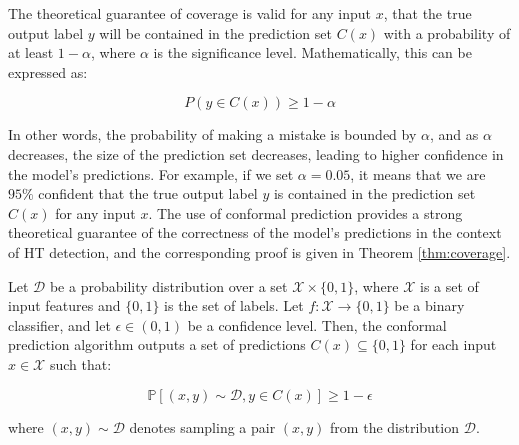 The theoretical guarantee of coverage is valid for any input $x$, that the true output label $y$ will be contained in the prediction set $C(x)$ with a probability of at least $1 - \alpha$, where $\alpha$ is the significance level. Mathematically, this can be expressed as:

$$
P(y \in C(x)) \geq 1 - \alpha
$$

In other words, the probability of making a mistake is bounded by $\alpha$, and as $\alpha$ decreases, the size of the prediction set decreases, leading to higher confidence in the model's predictions. For example, if we set $\alpha = 0.05$, it means that we are $95\%$ confident that the true output label $y$ is contained in the prediction set $C(x)$ for any input $x$. The use of conformal prediction provides a strong theoretical guarantee of the correctness of the model's predictions in the context of HT detection, and the corresponding proof is given in Theorem \ref{thm:coverage}.

\begin{theorem}\label{thm:coverage}
Let $\mathcal{D}$ be a probability distribution over a set $\mathcal{X} \times \{0,1\}$, where $\mathcal{X}$ is a set of input features and $\{0,1\}$ is the set of labels. Let $f: \mathcal{X} \to \{0,1\}$ be a binary classifier, and let $\epsilon \in (0,1)$ be a confidence level. Then, the conformal prediction algorithm outputs a set of predictions $C(x) \subseteq \{0,1\}$ for each input $x \in \mathcal{X}$ such that:

\begin{equation*}
\mathbb{P}[(x,y) \sim \mathcal{D}, y \in C(x)] \geq 1-\epsilon
\end{equation*}

where $(x,y) \sim \mathcal{D}$ denotes sampling a pair $(x,y)$ from the distribution $\mathcal{D}$.

\end{theorem}

